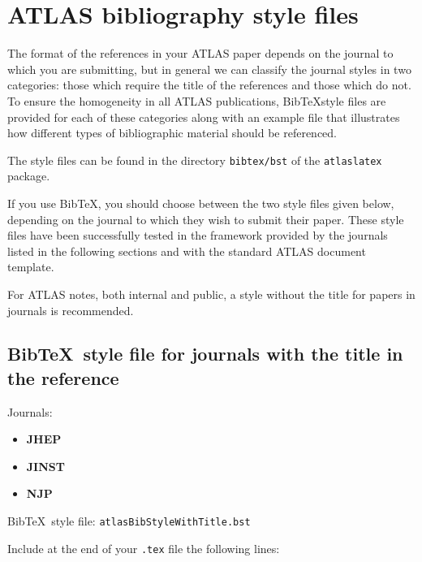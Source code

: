 \documentclass[UKenglish]{latex/atlasdoc}
\newcommand*{\BibTeX}{Bib\TeX}
\newcommand{\File}[1]{\texttt{#1}\xspace}
\newcommand{\Package}[1]{\texttt{#1}\xspace}
\begin{document}
\section{ATLAS bibliography style files}
\label{sec:atlasbst}

The format of the references in your ATLAS paper depends on the journal to which you are submitting,
but in general we can classify the journal styles in two categories: 
those which require the title of the references and those which do not. 
To ensure the homogeneity in all ATLAS publications, 
\BibTeX style files are provided for each of these categories 
along with an example file that illustrates how different types of bibliographic material should be referenced.

The style files can be found in the directory \File{bibtex/bst} of the \Package{atlaslatex} package.

If you use \BibTeX, you should choose between the two style files given below, 
depending on the journal to which they wish to submit their paper.
These style files have been successfully tested in the framework provided by 
the journals listed in the following sections and with the standard ATLAS document template.

For ATLAS notes, both internal and public, a style without the title for papers in journals is recommended.


\subsection{\BibTeX\ style file for journals with the title in the reference}
\label{sec:withtitle}

Journals:
\begin{itemize}\setlength{\parskip}{0pt}\setlength{\itemsep}{0pt}
\item \textbf{JHEP}
\item \textbf{JINST}
\item \textbf{NJP}
\end{itemize}
%
\BibTeX\ style file: \Package{atlasBibStyleWithTitle.bst}

\noindent Include at the end of your \File{.tex} file the following lines:
\begin{verbatim}


\end{verbatim}
\end{document}
